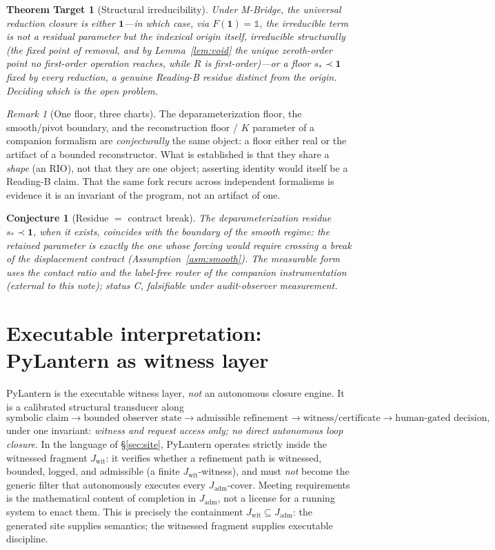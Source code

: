 \documentclass[11pt]{article}
\newtheorem*{theoremtarget}{Theorem Target}
\newtheorem*{conjecture}{Conjecture}
\theoremstyle{definition}
\theoremstyle{remark}
\newtheorem*{remark}{Remark}
\newcommand{\Jadm}{J_{\mathrm{adm}}}
\newcommand{\Jwit}{J_{\mathrm{wit}}}
\begin{document}
\begin{theoremtarget}[Structural irreducibility]
Under M-Bridge, the universal reduction closure is either $\mathbf{1}$---in which case, via
$F(\mathbf{1})=\mathbb{1}$, the irreducible term is not a residual parameter but the indexical origin
itself, irreducible structurally (the fixed point of removal, and by Lemma~\ref{lem:void} the unique
zeroth-order point no first-order operation reaches, while $R$ is first-order)---or a floor
$s_*\prec\mathbf{1}$ fixed by every reduction, a genuine Reading-B residue distinct from the origin.
Deciding which is the open problem.
\end{theoremtarget}

\begin{remark}[One floor, three charts]
The deparameterization floor, the smooth/pivot boundary, and the reconstruction floor / $K$ parameter
of a companion formalism are \emph{conjecturally} the same object: a floor either real or the artifact
of a bounded reconstructor. What is established is that they share a \emph{shape} (an RIO), not that
they are one object; asserting identity would itself be a Reading-B claim. That the same fork recurs
across independent formalisms is evidence it is an invariant of the program, not an artifact of one.
\end{remark}

\begin{conjecture}[Residue $=$ contract break]
The deparameterization residue $s_*\prec\mathbf{1}$, when it exists, coincides with the boundary of
the smooth regime: the retained parameter is exactly the one whose forcing would require crossing a
break of the displacement contract (Assumption~\ref{asm:smooth}). The measurable form uses the
contact ratio and the label-free router of the companion instrumentation (external to this note);
status C, falsifiable under audit-observer measurement.
\end{conjecture}

\section{Executable interpretation: PyLantern as witness layer}\label{sec:pylantern}

PyLantern is the executable witness layer, \emph{not} an autonomous closure engine. It is a calibrated
structural transducer along
\[
  \text{symbolic claim} \to \text{bounded observer state} \to \text{admissible refinement}
  \to \text{witness/certificate} \to \text{human-gated decision},
\]
under one invariant: \emph{witness and request access only; no direct autonomous loop closure}.
In the language of \S\ref{sec:site}, PyLantern operates strictly inside the witnessed fragment
$\Jwit$: it verifies whether a refinement path is witnessed, bounded, logged, and admissible (a finite
$\Jwit$-witness), and must \emph{not} become the generic filter that autonomously executes every
$\Jadm$-cover. Meeting requirements is the mathematical content of completion in $\Jadm$, not a license
for a running system to enact them. This is precisely the containment $\Jwit\subseteq\Jadm$: the
generated site supplies semantics; the witnessed fragment supplies executable discipline.
\end{document}
